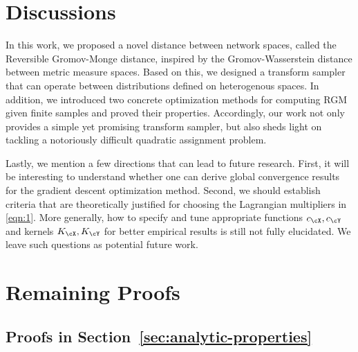 \documentclass[11pt]{article}
\begin{document}
\section{Discussions}
In this work, we proposed a novel distance between network spaces, called the Reversible Gromov-Monge distance, inspired by the Gromov-Wasserstein distance between metric measure spaces. Based on this, we designed a transform sampler that can operate between distributions defined on heterogenous spaces. In addition, we introduced two concrete optimization methods for computing RGM given finite samples and proved their properties. Accordingly, our work not only provides a simple yet promising transform sampler, but also sheds light on tackling a notoriously difficult quadratic assignment problem.

Lastly, we mention a few directions that can lead to future research. First, it will be interesting to understand whether one can derive global convergence results for the gradient descent optimization method. Second, we should establish criteria that are theoretically justified for choosing the Lagrangian multipliers in \eqref{eqn:1}. More generally, how to specify and tune appropriate functions $c_{\cX}, c_{\cY}$ and kernels $K_{\cX}, K_{\cY}$ for better empirical results is still not fully elucidated. We leave such questions as potential future work. 


\newpage
\appendix
\section{Remaining Proofs}
\label{sec:appendix}
\subsection{Proofs in Section~\ref{sec:analytic-properties}}
\end{document}
